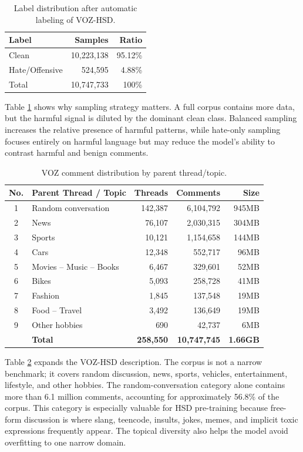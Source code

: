 \documentclass[journal]{IEEEtran}
\begin{document}
\begin{table}[!t]
\centering
\caption{Label distribution after automatic labeling of VOZ-HSD.}
\label{tab:vozdist}
\begin{tabular}{lrr}
\toprule
\textbf{Label} & \textbf{Samples} & \textbf{Ratio} \\
\midrule
Clean & 10,223,138 & 95.12\% \\
Hate/Offensive & 524,595 & 4.88\% \\
\midrule
Total & 10,747,733 & 100\% \\
\bottomrule
\end{tabular}
\end{table}

Table \ref{tab:vozdist} shows why sampling strategy matters. A full corpus contains more data, but the harmful signal is diluted by the dominant clean class. Balanced sampling increases the relative presence of harmful patterns, while hate-only sampling focuses entirely on harmful language but may reduce the model's ability to contrast harmful and benign comments.

\begin{table}[!t]
\centering
\caption{VOZ comment distribution by parent thread/topic.}
\label{tab:voz_topics}
\begin{tabular}{clrrr}
\toprule
\textbf{No.} & \textbf{Parent Thread / Topic} & \textbf{Threads} & \textbf{Comments} & \textbf{Size} \\
\midrule
1 & Random conversation & 142,387 & 6,104,792 & 945MB \\
2 & News & 76,107 & 2,030,315 & 304MB \\
3 & Sports & 10,121 & 1,154,658 & 144MB \\
4 & Cars & 12,348 & 552,717 & 96MB \\
5 & Movies -- Music -- Books & 6,467 & 329,601 & 52MB \\
6 & Bikes & 5,093 & 258,728 & 41MB \\
7 & Fashion & 1,845 & 137,548 & 19MB \\
8 & Food -- Travel & 3,492 & 136,649 & 19MB \\
9 & Other hobbies & 690 & 42,737 & 6MB \\
\midrule
& \textbf{Total} & \textbf{258,550} & \textbf{10,747,745} & \textbf{1.66GB} \\
\bottomrule
\end{tabular}
\end{table}

Table \ref{tab:voz_topics} expands the VOZ-HSD description. The corpus is not a narrow benchmark; it covers random discussion, news, sports, vehicles, entertainment, lifestyle, and other hobbies. The random-conversation category alone contains more than 6.1 million comments, accounting for approximately 56.8\% of the corpus. This category is especially valuable for HSD pre-training because free-form discussion is where slang, teencode, insults, jokes, memes, and implicit toxic expressions frequently appear. The topical diversity also helps the model avoid overfitting to one narrow domain.
\end{document}
